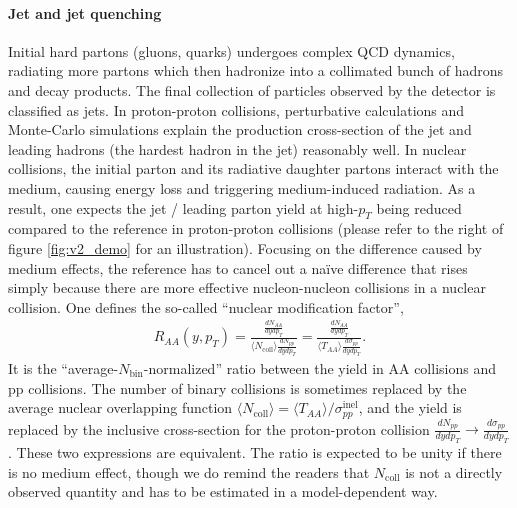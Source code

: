 \paragraph{Jet and jet quenching}
Initial hard partons (gluons, quarks) undergoes complex QCD dynamics, radiating more partons which then hadronize into a collimated bunch of hadrons and decay products.
The final collection of particles observed by the detector is classified as jets.
In proton-proton collisions, perturbative calculations and Monte-Carlo simulations explain the production cross-section of the jet and leading hadrons (the hardest hadron in the jet) reasonably well.
In nuclear collisions, the initial parton and its radiative daughter partons interact with the medium, causing energy loss and triggering medium-induced radiation.
As a result, one expects the jet / leading parton yield at high-$p_T$ being reduced compared to the reference in proton-proton collisions (please refer to the right of figure \ref{fig:v2_demo} for an illustration).
Focusing on the difference caused by medium effects, the reference has to cancel out a na\"ive difference that rises simply because there are more effective nucleon-nucleon collisions in a nuclear collision.
One defines the so-called ``nuclear modification factor'',
\begin{eqnarray}
R_{AA}(y, p_T) = \frac{\frac{dN_{AA}}{dy dp_T}}{\langle N_{\textrm{coll}}\rangle \frac{dN_{pp}}{dy dp_T}} = \frac{\frac{dN_{AA}}{dy dp_T}}{\langle T_{AA} \rangle \frac{d\sigma_{pp}}{dy dp_T}}.
\end{eqnarray}
It is the ``average-$N_{\textrm{bin}}$-normalized'' ratio between the yield in AA collisions and pp collisions.
The number of binary collisions is sometimes replaced by the average nuclear overlapping function $\langle N_{\textrm{coll}}\rangle = \langle T_{AA} \rangle /\sigma_{pp}^{\textrm{inel}}$, and the yield is replaced by the inclusive cross-section for the proton-proton collision $\frac{dN_{pp}}{dy dp_T}\rightarrow \frac{d\sigma_{pp}}{dy dp_T}$.
These two expressions are equivalent.
The ratio is expected to be unity if there is no medium effect, though we do remind the readers that $N_{\textrm{coll}}$ is not a directly observed quantity and has to be estimated in a model-dependent way.

